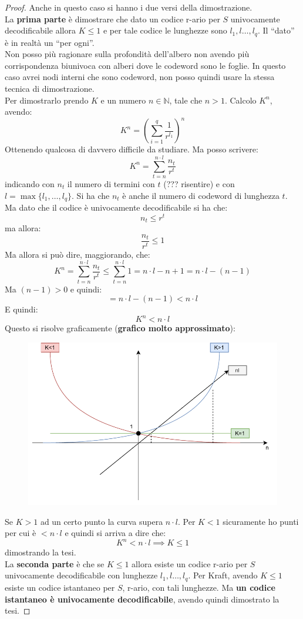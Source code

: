 \documentclass[a4paper,12pt, oneside]{book}
\begin{document}
\begin{proof}
  Anche in questo caso si hanno i due versi della dimostrazione.\\
  La \textbf{prima parte} è dimostrare che dato un codice r-ario per $S$
  univocamente decodificabile allora $K\leq 1$ e per tale codice le lunghezze
  sono $l_1,l\dots,l_q$. Il ``dato'' è in realtà un ``per ogni''.\\
  Non posso più ragionare sulla profondità dell'albero non avendo più
  corrispondenza biunivoca con alberi dove le codeword sono le foglie. In questo
  caso avrei nodi interni che sono codeword, non posso quindi usare la stessa
  tecnica di dimostrazione.\\
  Per dimostrarlo prendo $K$ e un numero $n\in\mathbb{N}$, tale che
  $n>1$. Calcolo $K^n$, avendo:
  \[K^n=\left(\sum_{i=1}^q\frac{1}{r^{l_1}}\right)^n\]
  Ottenendo qualcosa di davvero difficile da studiare. Ma posso scrivere:
  \[K^n=\sum_{t=n}^{n\cdot l}\frac{n_t}{r^{t}}\]
  indicando con $n_t$ il numero di termini con $t$ (??? risentire) e con
  $l=\max\{l_1,\ldots,l_q\}$. Si ha che $n_t$ è anche il numero di codeword di
  lunghezza $t$. Ma dato che il codice è univocamente decodificabile si ha che:
  \[n_t\leq r^t\]
  ma allora:
  \[\frac{n_t}{r^{t}}\leq 1\]
  Ma allora si può dire, maggiorando, che:
  \[K^n=\sum_{t=n}^{n\cdot l}\frac{n_t}{r^{t}}\leq \sum_{t=n}^{n\cdot
      l}1=n\cdot l-n+1=n\cdot l-(n-1)\]
  Ma $(n-1)>0$ e quindi:
  \[=n\cdot l-(n-1) < n\cdot l\]
  E quindi:
  \[K^n<n\cdot l\]
  \newpage
  Questo si risolve graficamente (\textbf{grafico molto approssimato}):
  \begin{figure}[H]
    \centering
    \includegraphics[scale = 0.8]{img/grap.pdf}
  \end{figure}
  Se $K>1$ ad un certo punto la curva supera $n\cdot l$. Per $K<1$ sicuramente
  ho punti per cui è $<n\cdot l$ e quindi si arriva a dire che:
  \[K^n<n\cdot l\implies K\leq 1\]
  dimostrando la tesi.\\
  
  La \textbf{seconda parte} è che se $K\leq 1$ allora esiste un codice r-ario
  per $S$ univocamente decodificabile con lunghezze $l_1,l\dots,l_q$. Per Kraft,
  avendo $K\leq 1$ esiste un codice istantaneo per $S$, r-ario, con tali
  lunghezze. Ma \textbf{un codice istantaneo è univocamente decodificabile},
  avendo quindi dimostrato la tesi.
\end{proof}
\end{document}
